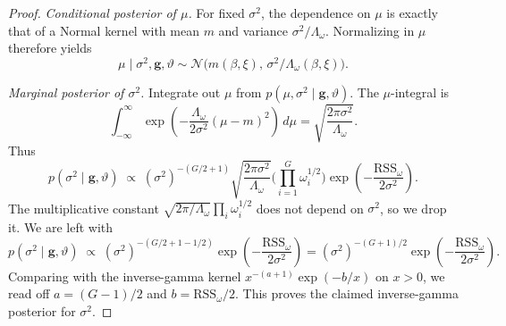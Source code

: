 \begin{proof}
\emph{Conditional posterior of \(\mu\).}
For fixed \(\sigma^2\), the dependence on \(\mu\) is exactly that of a Normal kernel with mean \(m\) and variance \(\sigma^2/\Lambda_\omega\).
Normalizing in \(\mu\) therefore yields
\[
\mu\mid\sigma^2,\mathbf g,\vartheta
\sim \mathcal N\!\big(m(\beta,\xi),\,\sigma^2/\Lambda_\omega(\beta,\xi)\big).
\]

\emph{Marginal posterior of \(\sigma^2\).}
Integrate out \(\mu\) from \(p(\mu,\sigma^2\mid\mathbf g,\vartheta)\).
The \(\mu\)-integral is
\[
\int_{-\infty}^{\infty}
\exp\!\left(-\frac{\Lambda_\omega}{2\sigma^2}(\mu-m)^2\right)\,d\mu
=\sqrt{\frac{2\pi\sigma^2}{\Lambda_\omega}}.
\]
Thus
\[
p(\sigma^2\mid\mathbf g,\vartheta)
\;\propto\;
(\sigma^2)^{-(G/2+1)}
\sqrt{\frac{2\pi\sigma^2}{\Lambda_\omega}}
\Bigg(\prod_{i=1}^G \omega_i^{1/2}\Bigg)
\exp\!\left(-\frac{\mathrm{RSS}_\omega}{2\sigma^2}\right).
\]
The multiplicative constant
\(\sqrt{2\pi/\Lambda_\omega}\prod_i \omega_i^{1/2}\) does not depend on \(\sigma^2\), so we drop it.
We are left with
\[
p(\sigma^2\mid\mathbf g,\vartheta)
\;\propto\;
(\sigma^2)^{-(G/2+1-1/2)}\exp\!\left(-\frac{\mathrm{RSS}_\omega}{2\sigma^2}\right)
=(\sigma^2)^{-(G+1)/2}\exp\!\left(-\frac{\mathrm{RSS}_\omega}{2\sigma^2}\right).
\]
Comparing with the inverse-gamma kernel
\(x^{-(a+1)}\exp(-b/x)\) on \(x>0\),
we read off \(a=(G-1)/2\) and \(b=\mathrm{RSS}_\omega/2\).
This proves the claimed inverse-gamma posterior for \(\sigma^2\).
\end{proof}

